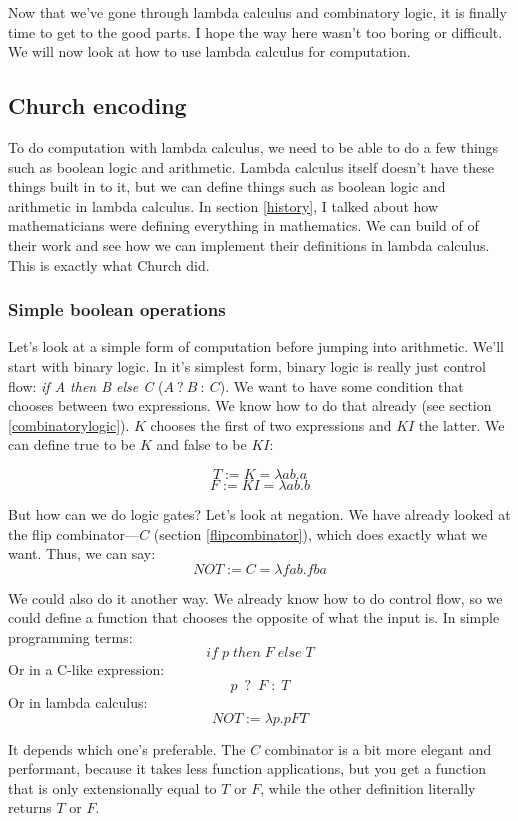 \documentclass[11pt]{article}
\begin{document}
Now that we've gone through lambda calculus and combinatory logic, it is
finally time to get to the good parts. I hope the way here wasn't too boring or
difficult. We will now look at how to use lambda calculus for computation.

\subsection{Church encoding}

To do computation with lambda calculus, we need to be able to do a few things
such as boolean logic and arithmetic. Lambda calculus itself doesn't have these
things built in to it, but we can define things such as boolean logic and
arithmetic in lambda calculus. In section \ref{history}, I talked about how
mathematicians were defining everything in mathematics. We can build of of
their work and see how we can implement their definitions in lambda calculus.
This is exactly what Church did.


\subsubsection{Simple boolean operations}\label{boolops}

Let's look at a simple form of computation before jumping into arithmetic.
We'll start with binary logic. In it's simplest form, binary logic is really
just control flow: \emph{if A then B else C} (\(A\:?\:B\::\:C\)). We want to
have some condition that chooses between two expressions. We know how to do
that already (see section \ref{combinatorylogic}). \(K\) chooses the first of
two expressions and \(KI\) the latter. We can define true to be \(K\) and false
to be \(KI\):

\[T:=K=\lambda ab.a\]
\[F:=KI=\lambda ab.b\]

But how can we do logic gates? Let's look at negation. We have already looked
at the flip combinator---\(C\) (section \ref{flipcombinator}), which does
exactly what we want. Thus, we can say:
\[NOT:=C=\lambda fab.fba\]

We could also do it another way. We already know how to do control flow, so we
could define a function that chooses the opposite of what the input is. In
simple programming terms:
\[if\;p\;then\;F\;else\;T\]
Or in a C-like expression:
\[p\enspace ?\enspace F\;:\;T\]
Or in lambda calculus:
\[NOT:=\lambda p.pFT\]

It depends which one's preferable. The \(C\) combinator is a bit more elegant
and performant, because it takes less function applications, but you get a
function that is only extensionally equal to \(T\) or \(F\), while the other
definition literally returns \(T\) or \(F\).
\end{document}
